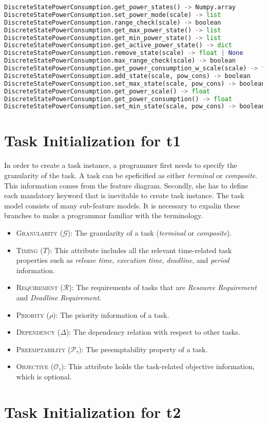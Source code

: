 \documentclass[]{scrartcl}
\begin{document}
\begin{lstlisting}[language=Python, frame=single, label={lst:cpu2memberFunctionsPowerDiscrete}, caption={The member functions for \textsf{DiscreteStatePowerConsumption} module.}]
DiscreteStatePowerConsumption.get_power_states() -> Numpy.array
DiscreteStatePowerConsumption.set_power_mode(scale) -> list
DiscreteStatePowerConsumption.range_check(scale) -> boolean
DiscreteStatePowerConsumption.get_max_power_state() -> list
DiscreteStatePowerConsumption.get_min_power_state() -> list
DiscreteStatePowerConsumption.get_active_power_state() -> dict
DiscreteStatePowerConsumption.remove_state(scale) -> float | None
DiscreteStatePowerConsumption.max_range_check(scale) -> boolean
DiscreteStatePowerConsumption.get_power_consumption_w_scale(scale) -> float
DiscreteStatePowerConsumption.add_state(scale, pow_cons) -> boolean
DiscreteStatePowerConsumption.set_max_state(scale, pow_cons) -> boolean
DiscreteStatePowerConsumption.get_power_scale() -> float
DiscreteStatePowerConsumption.get_power_consumption() -> float
DiscreteStatePowerConsumption.set_min_state(scale, pow_cons) -> boolean
\end{lstlisting}
        
            
\section{Task Initialization for \textsf{t1}}
        
In order to create a task instance, a programmer first needs to specify the granularity of the task. A task can be speficified as either \emph{terminal} or \emph{composite}. This information comes from the feature diagram.
Secondly, she has to define each mandatory keyword that is inevitable to create task instance. The task model consists of many sub-feature models. It is necessary to expalin these branches to make a programmar familiar with
the terminology.
\begin{itemize}
    \item \textsc{Granularity} ($\mathcal{G}$): The granularity of a task (\emph{terminal} or \emph{composite}).
    \item \textsc{Timing} ($T$): This attribute includes all the relevant time-related task properties such as \emph{release time}, \emph{execution time}, \emph{deadline}, and \emph{period} information.
    \item \textsc{Requirement} ($\mathcal{R}$): The requirements of tasks that are \emph{Resource Requirement} and \emph{Deadline Requirement}.
    \item \textsc{Priority} ($\rho$): The priority information of a task.
    \item \textsc{Dependency} ($\Delta$): The dependency relation with respect to other tasks.
    \item \textsc{Preemptability} ($\mathcal{P}_\tau$): The preemptability property of a task.
    \item \textsc{Objective} ($\mathcal{O}_{\tau}$): This attribute holds the task-related objective information, which is optional.
\end{itemize}
            
\section{Task Initialization for \textsf{t2}}
        
\end{document}
